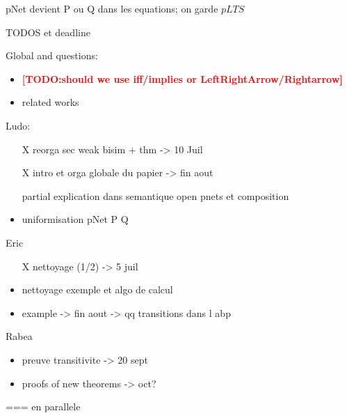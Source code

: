 \documentclass{lncs/llncs}
\newcommand{\TODO}[1]{\textcolor{red}{\textbf{[TODO:#1]}}}
\begin{document}
pNet devient P ou Q dans les equations; on garde $pLTS$

\medskip

TODOS et deadline


Global and questions:
\begin{itemize}
\item \TODO{should we use iff/implies or LeftRightArrow/Rightarrow}
\item related works
\end{itemize}
Ludo:
\begin{itemize}
\item[X] reorga sec weak bisim + thm -> 10 Juil
\item[X]  intro et orga globale du papier -> fin aout
\item[partial] explication dans semantique open pnets et composition
\item uniformisation pNet P Q
\end{itemize}

\medskip

Eric
\begin{itemize}
\item[X] nettoyage (1/2) -> 5 juil
\item nettoyage exemple et algo de calcul
\item example -> fin aout -> qq transitions dans l abp
\end{itemize}

\medskip

Rabea
\begin{itemize}
\item preuve transitivite -> 20 sept
\item proofs of new theorems -> oct?
\end{itemize}
=== en parallele
\end{document}
